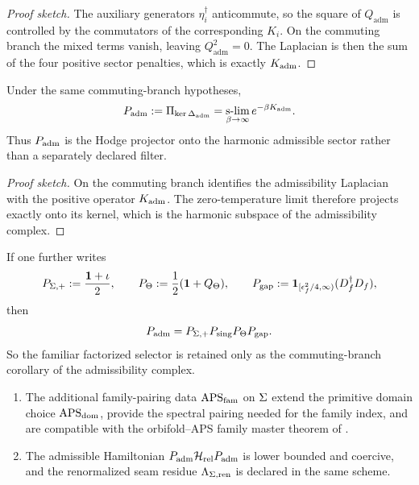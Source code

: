 \begin{proof}[Proof sketch]
The auxiliary generators $\eta_i^\dagger$ anticommute, so the square of $Q_{\mathrm{adm}}$ is controlled by the commutators of the corresponding $K_i$. On the commuting branch the mixed terms vanish, leaving $Q_{\mathrm{adm}}^2=0$. The Laplacian is then the sum of the four positive sector penalties, which is exactly $K_{\mathrm{adm}}$.
\end{proof}

\begin{lemma}
\label{lem:hodge-admissibility-projector}
Under the same commuting-branch hypotheses,
\[
P_{\mathrm{adm}}
:=
\Pi_{\ker\Delta_{\mathrm{adm}}}
=
\operatorname*{s-lim}_{\beta\to\infty}e^{-\beta K_{\mathrm{adm}}}.
\]
Thus $P_{\mathrm{adm}}$ is the Hodge projector onto the harmonic admissible sector rather than a separately declared filter.
\end{lemma}

\begin{proof}[Proof sketch]
On the commuting branch  identifies the admissibility Laplacian with the positive operator $K_{\mathrm{adm}}$. The zero-temperature limit therefore projects exactly onto its kernel, which is the harmonic subspace of the admissibility complex.
\end{proof}

\begin{corollary}
\label{cor:factorized-admissibility-selector}
If one further writes
\[
P_{\Sigma,+}:=\frac{\mathbf 1+\iota}{2},
\qquad
P_\Theta:=\frac12(\mathbf 1+Q_\Theta),
\qquad
P_{\mathrm{gap}}:=\mathbf 1_{[\epsilon_f^2/4,\infty)}(D_f^\dagger D_f),
\]
then
\[
P_{\mathrm{adm}}=P_{\Sigma,+}P_{\mathrm{sing}}P_\Theta P_{\mathrm{gap}}.
\]
So the familiar factorized selector is retained only as the commuting-branch corollary of the admissibility complex.
\end{corollary}

\begin{assumption}
\label{ass:remaining-closure-inputs}
\begin{enumerate}[label=(\arabic*), leftmargin=1.5em, topsep=3pt, itemsep=2pt]
    \item The additional family-pairing data $\mathrm{APS}_{\mathrm{fam}}$ on $\Sigma$ extend the primitive domain choice $\mathrm{APS}_{\mathrm{dom}}$, provide the spectral pairing needed for the family index, and are compatible with the orbifold--APS family master theorem of .
    \item The admissible Hamiltonian $P_{\mathrm{adm}}\mathcal H_{\mathrm{rel}}P_{\mathrm{adm}}$ is lower bounded and coercive, and the renormalized seam residue $\Lambda_{\Sigma,\mathrm{ren}}$ is declared in the same scheme.
\end{enumerate}
\end{assumption}

